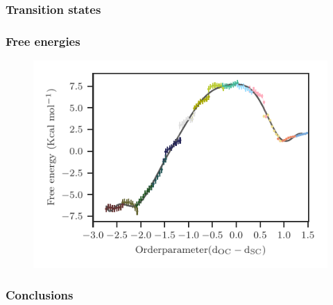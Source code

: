 \documentclass{beamer}
\begin{document}
\begin{frame}
\frametitle{Transition states}

\end{frame}
\begin{frame}
\frametitle{Free energies}
\begin{figure}
\includegraphics[scale=0.6]{figures/mat2a-fenergy.pdf}
\end{figure}
\end{frame}
\begin{frame}
\frametitle{Conclusions}

\end{frame}
%
%
%
%
\end{document}
